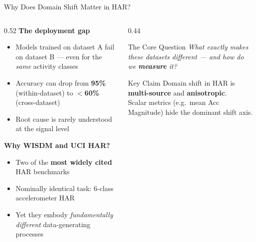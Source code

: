 \documentclass[aspectratio=169, 10pt]{beamer}
\begin{document}
\begin{frame}{Why Does Domain Shift Matter in HAR?}
  \begin{columns}[T]
    \begin{column}{0.52\textwidth}
      \textbf{The deployment gap}
      \begin{itemize}
        \item Models trained on dataset A fail on dataset B — even for the \emph{same} activity classes
        \item Accuracy can drop from \textbf{95\%} (within-dataset) to \textbf{$<$60\%} (cross-dataset)
        \item Root cause is rarely understood at the signal level
      \end{itemize}

      \vspace{4mm}
      \textbf{Why WISDM and UCI HAR?}
      \begin{itemize}
        \item Two of the \textbf{most widely cited} HAR benchmarks
        \item Nominally identical task: 6-class accelerometer HAR
        \item Yet they embody \emph{fundamentally different} data-generating processes
      \end{itemize}
    \end{column}

    \begin{column}{0.44\textwidth}
      \begin{block}{The Core Question}
        \centering
        \vspace{2mm}
        \emph{What exactly makes these datasets different — and how do we \textbf{measure} it?}
        \vspace{2mm}
      \end{block}

      \vspace{4mm}
      \begin{alertblock}{Key Claim}
        Domain shift in HAR is \textbf{multi-source} and \textbf{anisotropic}.\\
        Scalar metrics (e.g.\ mean Acc Magnitude) hide the dominant shift axis.
      \end{alertblock}
    \end{column}
  \end{columns}
\end{frame}

\end{document}
